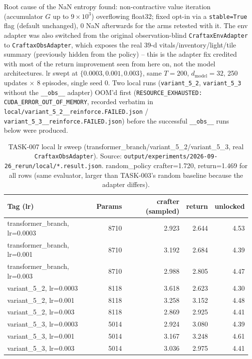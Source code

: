 \documentclass[11pt]{article}
\newcommand{\srcpath}[1]{\texttt{\small #1}}
\begin{document}
Root cause of the NaN entropy found: non-contractive value iteration (accumulator $G$ up to
$9\times10^3$) overflowing float32; fixed opt-in via a \texttt{stable=True} flag (default
unchanged), 0 NaN afterwards for the arms retested with it. The env adapter was also switched from
the original observation-blind \texttt{CraftaxEnvAdapter} to \texttt{CraftaxObsAdapter}, which
exposes the real 39-d vitals/inventory/light/tile summary (previously hidden from the policy) --
this is the adapter fix credited with most of the return improvement seen from here on, not the
model architectures. lr swept at $\{0.0003, 0.001, 0.003\}$, same $T=200$, $d_{\text{model}}=32$,
250 updates $\times$ 8 episodes, single seed 0. Two local runs (\texttt{variant\_5\_2},
\texttt{variant\_5\_3} without the \texttt{\_\_obs\_\_} adapter) OOM'd first
(\texttt{RESOURCE\_EXHAUSTED: CUDA\_ERROR\_OUT\_OF\_MEMORY}, recorded verbatim in
\srcpath{local/variant\_5\_2\_\_reinforce.FAILED.json} / \srcpath{variant\_5\_3\_\_reinforce.FAILED.json})
before the successful \texttt{\_\_obs\_\_} runs below were produced.

\begin{table}[h]
\centering
\small
\caption{TASK-007 local lr sweep (transformer\_branch/variant\_5\_2/variant\_5\_3, real \texttt{CraftaxObsAdapter}). Source: \srcpath{output/experiments/2026-09-26\_rerun/local/*.result.json}. random\_policy crafter=1.720, return=1.469 for all rows (same evaluator, larger than TASK-003's random baseline because the adapter differs).}
\begin{tabular}{lrrrr}
\toprule
Tag (lr) & Params & crafter (sampled) & return & unlocked \\
\midrule
transformer\_branch, lr=0.0003 & 8710 & 2.923 & 2.644 & 4.53 \\
transformer\_branch, lr=0.001 & 8710 & 3.192 & 2.684 & 4.39 \\
transformer\_branch, lr=0.003 & 8710 & 2.988 & 2.805 & 4.47 \\
variant\_5\_2, lr=0.0003 & 8118 & 3.618 & 2.623 & 4.30 \\
variant\_5\_2, lr=0.001 & 8118 & 3.258 & 3.152 & 4.48 \\
variant\_5\_2, lr=0.003 & 8118 & 2.869 & 2.925 & 4.41 \\
variant\_5\_3, lr=0.0003 & 5014 & 2.924 & 3.080 & 4.39 \\
variant\_5\_3, lr=0.001 & 5014 & 3.167 & 3.248 & 4.61 \\
variant\_5\_3, lr=0.003 & 5014 & 3.036 & 2.975 & 4.41 \\
\bottomrule
\end{tabular}
\end{table}
\end{document}
